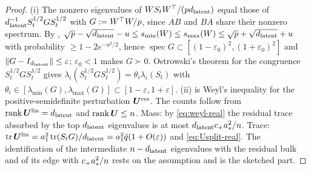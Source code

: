 \begin{proof}
(i) The nonzero eigenvalues of $WS_tW^\top/(pd_{\mathrm{latent}})$ equal those of $d_{\mathrm{latent}}^{-1}S_t^{1/2}GS_t^{1/2}$ with $G:=W^\top W/p$, since $AB$ and $BA$ share their nonzero spectrum. By \citet[Cor.~7.3.3]{vershynin2018hdp}, $\sqrt{p}-\sqrt{d_{\mathrm{latent}}}-u\le s_{\min}(W)\le s_{\max}(W)\le\sqrt{p}+\sqrt{d_{\mathrm{latent}}}+u$ with probability $\ge1-2e^{-u^2/2}$, hence $\operatorname{spec}G\subset[(1-\varepsilon_0)^2,(1+\varepsilon_0)^2]$ and $\|G-I_{d_{\mathrm{latent}}}\|\le\varepsilon$; $\varepsilon_0<1$ makes $G\succ0$. Ostrowski's theorem for the congruence $S_t^{1/2}GS_t^{1/2}$ gives $\lambda_i(S_t^{1/2}GS_t^{1/2})=\theta_i\lambda_i(S_t)$ with $\theta_i\in[\lambda_{\min}(G),\lambda_{\max}(G)]\subset[1-\varepsilon,1+\varepsilon]$. (ii) is Weyl's inequality for the positive-semidefinite perturbation $\bm{U}^{\mathrm{res}}$. The counts follow from $\operatorname{rank}\bm{U}^{\mathrm{lin}}=d_{\mathrm{latent}}$ and $\operatorname{rank}\bm{U}\le n$. Mass: by \eqref{eq:weyl-real} the residual trace absorbed by the top $d_{\mathrm{latent}}$ eigenvalues is at most $d_{\mathrm{latent}} c_+a_\ast^2/n$. Trace: $\operatorname{tr}\bm{U}^{\mathrm{lin}}=a_1^2\operatorname{tr}(S_tG)/d_{\mathrm{latent}}=a_1^2\hat q(1+O(\varepsilon))$ and \eqref{eq:Usplit-real}. The identification of the intermediate $n-d_{\mathrm{latent}}$ eigenvalues with the residual bulk and of its edge with $c_+a_\ast^2/n$ rests on the assumption and is the sketched part.
\end{proof}

